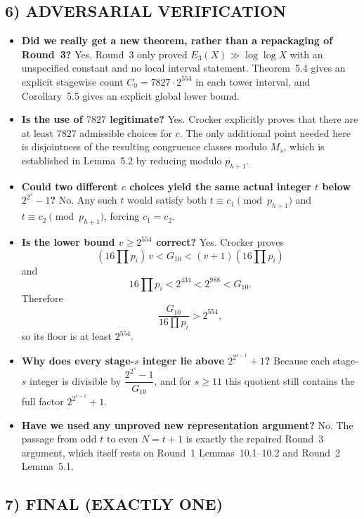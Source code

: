 \subsection{6) ADVERSARIAL VERIFICATION}

\begin{itemize}
\item \textbf{Did we really get a new theorem, rather than a repackaging of Round~3?}
Yes. Round~3 only proved $E_3(X)\gg \log\log X$ with an unspecified constant and no local interval statement. Theorem~5.4 gives an explicit stagewise count $C_0=7827\cdot 2^{554}$ in each tower interval, and Corollary~5.5 gives an explicit global lower bound.

\item \textbf{Is the use of $7827$ legitimate?}
Yes. Crocker explicitly proves that there are at least $7827$ admissible choices for $c$. The only additional point needed here is disjointness of the resulting congruence classes modulo $M_s$, which is established in Lemma~5.2 by reducing modulo $p_{h+1}$.

\item \textbf{Could two different $c$ choices yield the same actual integer $t$ below $2^{2^s}-1$?}
No. Any such $t$ would satisfy both $t\equiv c_1\pmod{p_{h+1}}$ and $t\equiv c_2\pmod{p_{h+1}}$, forcing $c_1=c_2$.

\item \textbf{Is the lower bound $v\ge 2^{554}$ correct?}
Yes. Crocker proves
\[
(16\prod p_i)\,v<G_{10}<(v+1)(16\prod p_i)
\]
and
\[
16\prod p_i<2^{434}<2^{988}<G_{10}.
\]
Therefore
\[
\frac{G_{10}}{16\prod p_i}>2^{554},
\]
so its floor is at least $2^{554}$.

\item \textbf{Why does every stage-$s$ integer lie above $2^{2^{s-1}}+1$?}
Because each stage-$s$ integer is divisible by $\dfrac{2^{2^s}-1}{G_{10}}$, and for $s\ge 11$ this quotient still contains the full factor $2^{2^{s-1}}+1$.

\item \textbf{Have we used any unproved new representation argument?}
No. The passage from odd $t$ to even $N=t+1$ is exactly the repaired Round~3 argument, which itself rests on Round~1 Lemmas~10.1--10.2 and Round~2 Lemma~5.1.
\end{itemize}

\subsection{7) FINAL (EXACTLY ONE)}

